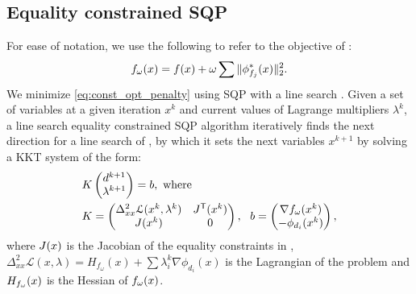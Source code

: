 \subsection{Equality constrained SQP}
For ease of notation, we use the following to refer to the objective of :
\begin{equation}
f_\omega(x) = f(x) + \omega \sum \|\phi^*_{f_j}(x)\|_2^2.
\end{equation}
We minimize \eqref{eq:const_opt_penalty} using SQP with a line search \cite{nocedal}. Given a set of variables at a given iteration $x^k$ and current values of Lagrange multipliers $\lambda^k$, a line search equality constrained SQP algorithm iteratively finds the next direction for a line search of , by which it sets the next variables $x^{k+1}$ by solving a KKT system of the form:
%
\begin{equation} \label{eq:KKT_eps}
\begin{aligned}
&{K} \begin{pmatrix} d^{k+1} \\ \lambda^{k+1} \end{pmatrix}={b}, \ \text{where} \\
&{K}=\begin{pmatrix}
{\Delta^2_{xx}\mathcal{L}(x^k,\lambda^k)} & {J^\tr}(\x^k)\\
{J(\x^k)} &  0 \\
\end{pmatrix}, \ \ 
{b}=\begin{pmatrix}
{\nabla f_\omega(x^k)} \\ 
-\phi_{d_i}(x^k)\\
\end{pmatrix},
\end{aligned}
\end{equation}
%
where $J(x)$ is the Jacobian of the equality constraints in , $\Delta^2_{xx}\mathcal{L}(x,\lambda) = H_{f_\omega}(x)+\sum\lambda_i^{k} \nabla \phi_{d_i}(x)$ is the Lagrangian of the problem and $H_{f_\omega}(x)$ is the Hessian of $f_\omega(x)$.

